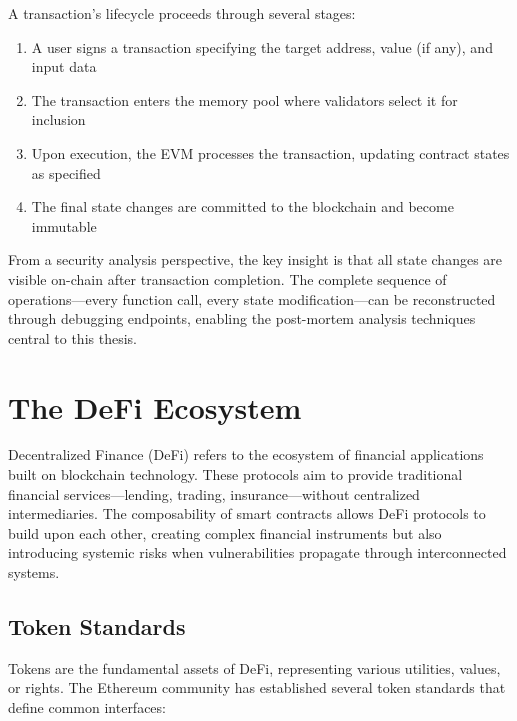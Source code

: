 A transaction's lifecycle proceeds through several stages:
\begin{enumerate}
    \item A user signs a transaction specifying the target address, value (if any), and input data
    \item The transaction enters the memory pool where validators select it for inclusion
    \item Upon execution, the EVM processes the transaction, updating contract states as specified
    \item The final state changes are committed to the blockchain and become immutable
\end{enumerate}

From a security analysis perspective, the key insight is that all state changes are visible on-chain after transaction completion. The complete sequence of operations---every function call, every state modification---can be reconstructed through debugging endpoints, enabling the post-mortem analysis techniques central to this thesis.

\section{The DeFi Ecosystem}
\label{sec:bg-defi}

Decentralized Finance (DeFi) refers to the ecosystem of financial applications built on blockchain technology. These protocols aim to provide traditional financial services---lending, trading, insurance---without centralized intermediaries. The composability of smart contracts allows DeFi protocols to build upon each other, creating complex financial instruments but also introducing systemic risks when vulnerabilities propagate through interconnected systems.

\subsection{Token Standards}

Tokens are the fundamental assets of DeFi, representing various utilities, values, or rights. The Ethereum community has established several token standards that define common interfaces:

